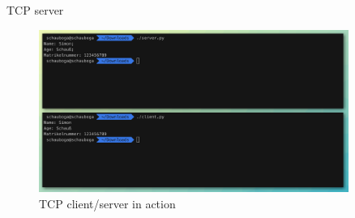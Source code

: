 \documentclass{WeSTassignment}
\begin{document}
\begin{listing}
	\centering
	\inputminted{python}{tango_assignment2_4_server.py}
    \caption{TCP server}
\end{listing}


\begin{figure}[ht]
	\centering
	\includegraphics[width=0.9\textwidth]{tango_assignment2_4.png}
	\caption{TCP client/server in action}
	\label{fig:tcp_server}
\end{figure}



\makefooter
\end{document}

